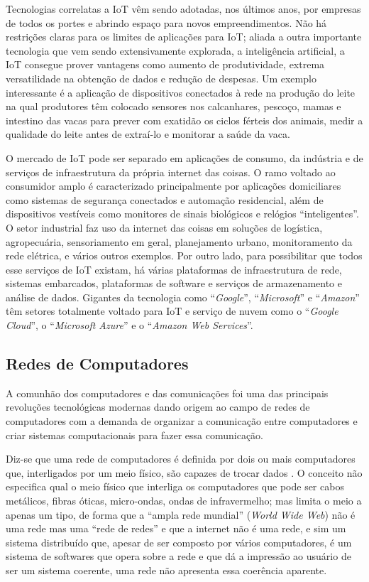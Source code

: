 Tecnologias correlatas a \ac{IoT} vêm sendo adotadas, nos últimos anos, por empresas de todos os portes e abrindo espaço para novos empreendimentos. Não há restrições claras para os limites de aplicações para \ac{IoT}; aliada a outra importante tecnologia que vem sendo extensivamente explorada, a inteligência artificial, a \ac{IoT} consegue prover vantagens como aumento de produtividade, extrema versatilidade na obtenção de dados e redução de despesas. Um exemplo interessante é a aplicação de dispositivos conectados à rede na produção do leite \cite{milk} na qual produtores têm colocado sensores nos calcanhares, pescoço, mamas e intestino das vacas para prever com exatidão os ciclos férteis dos animais, medir a qualidade do leite antes de extraí-lo e monitorar a saúde da vaca.

O mercado de \ac{IoT} pode ser separado em aplicações de consumo, da indústria e de serviços de infraestrutura da própria internet das coisas. O ramo voltado ao consumidor amplo é caracterizado principalmente por aplicações domiciliares como sistemas de segurança conectados e automação residencial, além de dispositivos vestíveis como monitores de sinais biológicos e relógios “inteligentes”. O setor industrial faz uso da internet das coisas em soluções de logística, agropecuária, sensoriamento em geral, planejamento urbano, monitoramento da rede elétrica, e vários outros exemplos. Por outro lado, para possibilitar que todos esse serviços de \ac{IoT} existam, há várias plataformas de infraestrutura de rede, sistemas embarcados, plataformas de software e serviços de armazenamento e análise de dados. Gigantes da tecnologia como “\textit{Google}”, “\textit{Microsoft}” e “\textit{Amazon}” têm setores totalmente voltado para \ac{IoT} e serviço de nuvem como o “\textit{Google Cloud}”, o “\textit{Microsoft Azure}” e o “\textit{Amazon Web Services}”.

\subsection{Redes de Computadores}

A comunhão dos computadores e das comunicações foi uma das principais revoluções tecnológicas modernas dando origem ao campo de redes de computadores com a demanda de organizar a comunicação entre computadores e criar sistemas computacionais para fazer essa comunicação.

Diz-se que uma rede de computadores é definida por dois ou mais computadores que, interligados por um meio físico, são capazes de trocar dados \cite{redes}. O conceito não especifica qual o meio físico que interliga os computadores que pode ser cabos metálicos, fibras óticas, micro-ondas, ondas de infravermelho; mas limita o meio a apenas um tipo, de forma que a “ampla rede mundial” (\textit{World Wide Web}) não é uma rede mas uma “rede de redes” e que a internet não é uma rede, e sim um sistema distribuído que, apesar de ser composto por vários computadores, é um sistema de softwares que opera sobre a rede e que dá a impressão ao usuário de ser um sistema coerente, uma rede não apresenta essa coerência aparente.

